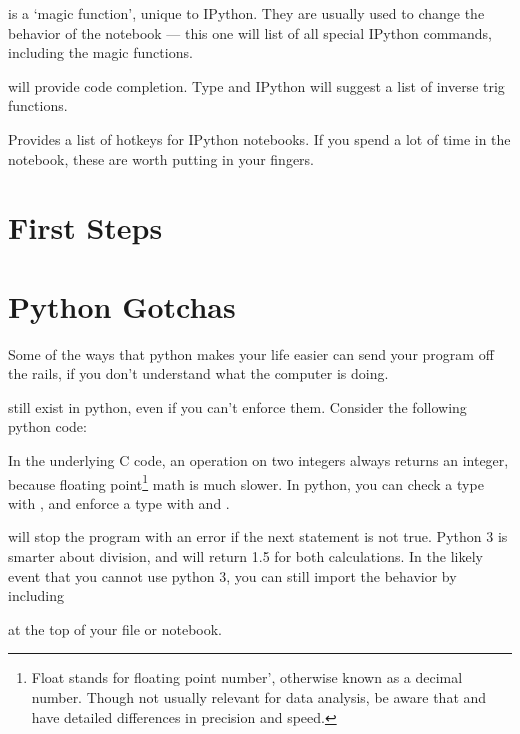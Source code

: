\documentclass[justified, nobib]{tufte-handout}
\newcommand{\floatNote}{\footnote{ Float stands for floating
  point number', otherwise known as a decimal number.
  Though not usually relevant for data analysis, be aware that
  \ipythoninline{int} and \ipythoninline{float} have detailed differences in
  precision and speed.}}
\begin{document}
  is a `magic function', unique to IPython.
  They are usually used to change the behavior of the notebook
  --- this one will list of all special IPython commands, including the magic
  functions.

 will provide code completion.
  Type  and IPython
  will suggest a list of inverse trig functions.

 Provides a list of hotkeys for IPython
  notebooks.
  If you spend a lot of time in the notebook, these are worth putting in your
  fingers.

\pagebreak
\section*{First Steps}


\pagebreak

\section*{Python Gotchas}
Some of the ways that python makes your life easier can send your program off
the rails, if you don't understand what the computer is doing.

 still exist in python, even if you can't enforce
them. Consider the following python code:
\begin{adjustwidth}{2.0em}{0pt}

\end{adjustwidth}

\noindent
In the underlying C code, an operation on two integers always returns an
integer, because floating point\floatNote{} \;math is much slower. In python,
you can check a type with , and enforce a
type with  and .
\begin{adjustwidth}{2.0em}{0pt}

\end{adjustwidth}
 will stop the program with an error if the next
statement is not true.
Python 3 is smarter about division, and will return 1.5 for both calculations.
In the likely event that you cannot use python 3, you can still
import the behavior by including
\begin{adjustwidth}{2.0em}{0pt}

\end{adjustwidth}
at the top of your file or notebook.
\end{document}
